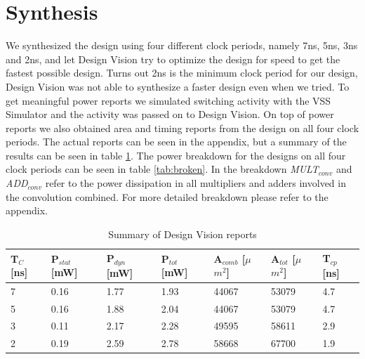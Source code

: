 \documentclass[11pt,a4paper]{article}
\begin{document}
\FloatBarrier
\section{Synthesis}
\label{sec:synthesis}
We synthesized the design using four different clock periods, namely 7ns, 5ns, 3ns and 2ns, and let Design Vision try to optimize the design for speed to get the fastest possible design. Turns out 2ns is the minimum clock period for our design, Design Vision was not able to synthesize a faster design even when we tried. To get meaningful power reports we simulated switching activity with the VSS Simulator and the activity was passed on to Design Vision. On top of power reports we also obtained area and timing reports from the design on all four clock periods. The actual reports can be seen in the appendix, but a summary of the results can be seen in table \ref{tab:synth}. The power breakdown for the designs on all four clock periods can be seen in table \ref{tab:broken}. In the breakdown \textit{MULT}$_{conv}$ and \textit{ADD}$_{conv}$ refer to the power dissipation in all multipliers and adders involved in the convolution combined. For more detailed breakdown please refer to the appendix.

\begin{table}[h]
	\caption{Summary of Design Vision reports}
	\begin{center}
		\begin{tabular}{|l|l|l|l|l|l|l|} \hline
			\textbf{T}$_{C}$ [ns]	& \textbf{P}$_{stat}$	[mW] & \textbf{P}$_{dyn}$ [mW]	& \textbf{P}$_{tot}$ [mW] & \textbf{A}$_{comb}$ [$\mu$$m^2$]& \textbf{A}$_{tot}$ [$\mu$$m^2$] & \textbf{T}$_{cp}$ [ns] \\ \hline
			7 & 0.16 & 1.77 & 1.93 & 44067 & 53079 & 4.7 \\ \hline
			5 & 0.16 & 1.88 & 2.04 & 44067 & 53079 & 4.7 \\ \hline
			3 & 0.11 & 2.17 & 2.28 & 49595 & 58611 & 2.9 \\ \hline
			2 & 0.19 & 2.59 & 2.78 & 58668 & 67700 & 1.9 \\ \hline
			
		\end{tabular}
	\end{center}
	\label{tab:synth}
\end{table}
\end{document}
